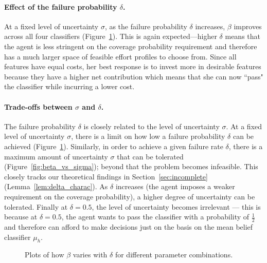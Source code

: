 \paragraph{Effect of the failure probability $\delta$.} At a fixed level of uncertainty $\sigma$, as the failure probability $\delta$ increases, $\beta$ improves across all four classifiers (Figure~\ref{fig:l2_unknown_classifier}). This is again expected---higher $\delta$ means that the agent is less stringent on the coverage probability requirement and therefore has a much larger space of feasible effort profiles to choose from. Since all features have equal costs, her best response is to invest more in desirable features because they have a higher net contribution which means that she can now ``pass" the classifier while incurring a lower cost.     


\paragraph{Trade-offs between $\sigma$ and $\delta$.} The failure probability $\delta$ is closely related to the level of uncertainty $\sigma$. At a fixed level of uncertainty $\sigma$, there is a limit on how low a failure probability $\delta$ can be achieved (Figure~\ref{fig:l2_unknown_classifier}). Similarly, in order to achieve a given failure rate $\delta$, there is a maximum amount of uncertainty $\sigma$ that can be tolerated (Figure~\ref{fig:beta_vs_sigma}); beyond that the problem becomes infeasible. This closely tracks our theoretical findings in Section~\ref{sec:incomplete} (Lemma~\ref{lem:delta_charac}). As $\delta$ increases (the agent imposes a weaker requirement on the coverage probability), a higher degree of uncertainty can be tolerated. Finally at $\delta = 0.5$, the level of uncertainty becomes irrelevant --- this is because at $\delta = 0.5$, the agent wants to pass the classifier with a probability of $\frac{1}{2}$ and therefore can afford to make decisions just on the basis on the mean belief classifier $\mu_h$. 

\begin{figure}[!ht]
  \centering
  \hfill
  \hfill
  \par
  \hfill
  \hfill
  \par
  \caption{Plots of how $\beta$ varies with $\delta$ for different parameter combinations.} 
  \label{fig:l2_unknown_classifier}
\end{figure}

